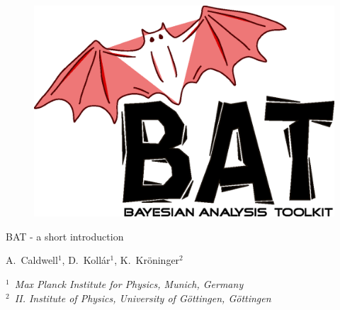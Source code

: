 \documentclass[11pt, a4paper]{article}
\begin{document}

\thispagestyle{empty} 

\begin{figure}
\includegraphics[scale=0.25]{bat.eps} 
\end{figure} 

\vspace{1.0cm}

\begin{center}

{\Large {\sc BAT} - a short introduction} 

\vspace{1.0cm}

{A.~Caldwell$^1$, D.~Koll\'ar$^1$, K.~Kr\"oninger$^2$}

\vspace{1.0cm}

{\it $^1$~Max Planck Institute for Physics, Munich, Germany \\ 
$^2$~II. Institute of Physics, University of G\"ottingen, G\"ottingen }
\end{center}

\thispagestyle{empty} 

\pagebreak 


\thispagestyle{empty} 

\tableofcontents

\pagebreak 
\end{document}
